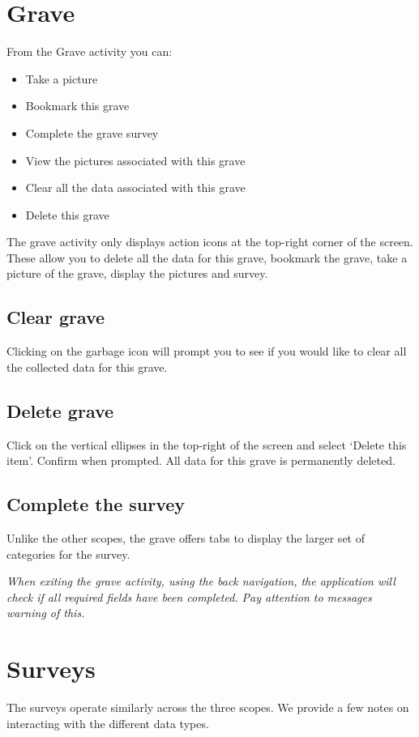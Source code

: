 \documentclass{scrreprt}
\begin{document}
\section{Grave}
From the Grave activity you can:
\begin{itemize}
\item Take a picture
\item Bookmark this grave
\item Complete the grave survey
\item View the pictures associated with this grave
\item Clear all the data associated with this grave
\item Delete this grave
\end{itemize}

The grave activity only displays action icons at the top-right corner of the screen. These allow you to delete all the data for this grave, bookmark the grave, take a picture of the grave, display the pictures and survey.

\subsection{Clear grave}
Clicking on the garbage icon will prompt you to see if you would like to clear all the collected data for this grave.

\subsection{Delete grave}
Click on the vertical ellipses in the top-right of the screen and select `Delete this item'. Confirm when prompted. All data for this grave is permanently deleted.

\subsection{Complete the survey}
Unlike the other scopes, the grave offers tabs to display the larger set of categories for the survey.

\textit{When exiting the grave activity, using the back navigation, the application will check if all required fields have been completed. Pay attention to messages warning of this.}

\section{Surveys}
\label{au_surveys}
The surveys operate similarly across the three scopes. We provide a few notes on interacting with the different data types.
\end{document}
